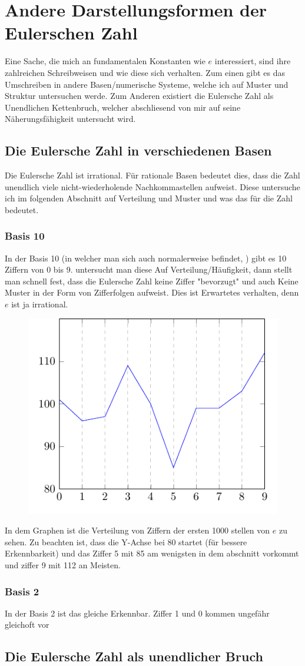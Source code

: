 \section{Andere Darstellungsformen der Eulerschen Zahl}
Eine Sache, die mich an fundamentalen Konstanten wie $e$ interessiert, sind ihre zahlreichen Schreibweisen und wie diese sich verhalten. Zum einen gibt es das Umschreiben in andere Basen/numerische Systeme, welche ich auf Muster und Struktur untersuchen werde. Zum Anderen existiert die Eulersche Zahl als Unendlichen Kettenbruch, welcher abschliesend von mir auf seine Näherungsfähigkeit untersucht wird. \subsection{Die Eulersche Zahl in verschiedenen Basen}
Die Eulersche Zahl ist irrational. Für rationale Basen bedeutet dies, dass die Zahl unendlich viele nicht-wiederholende Nachkommastellen aufweist. Diese untersuche ich im folgenden Abschnitt auf Verteilung und Muster und was das für die Zahl bedeutet.
\subsubsection{Basis 10}
In der Basis 10 (in welcher man sich auch normalerweise befindet, ) gibt es 10 Ziffern von 0 bis 9. untersucht man diese Auf Verteilung/Häufigkeit, dann stellt man schnell fest, dass die Eulersche Zahl keine Ziffer "bevorzugt" und auch Keine Muster in der Form von Zifferfolgen aufweist. Dies ist Erwartetes verhalten, denn $e$ ist ja irrational.
\begin{figure}[h]
  \includegraphics{medien2/basis10/basis10.pdf}
  \centering
\end{figure}
\par In dem Graphen ist die Verteilung von Ziffern der ersten 1000 stellen von $e$ zu sehen. Zu beachten ist, dass die Y-Achse bei 80 startet (für bessere Erkennbarkeit) und das Ziffer 5 mit 85 am wenigsten in dem abschnitt vorkommt und ziffer 9 mit 112 an Meisten.
\subsubsection{Basis 2}
In der Basis 2 ist das gleiche Erkennbar. Ziffer 1 und 0 kommen ungefähr gleichoft vor
\subsection{Die Eulersche Zahl als unendlicher Bruch}

